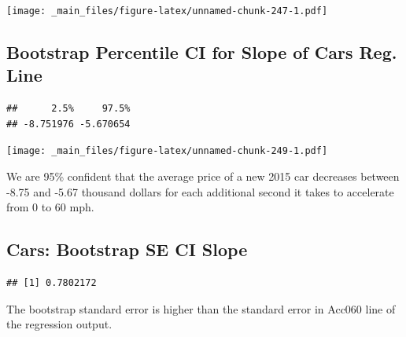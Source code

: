 \documentclass[]{book}
\newenvironment{Shaded}{\begin{snugshade}}{\end{snugshade}}
\newcommand{\KeywordTok}[1]{\textcolor[rgb]{0.13,0.29,0.53}{\textbf{#1}}}
\newcommand{\DecValTok}[1]{\textcolor[rgb]{0.00,0.00,0.81}{#1}}
\newcommand{\FloatTok}[1]{\textcolor[rgb]{0.00,0.00,0.81}{#1}}
\newcommand{\StringTok}[1]{\textcolor[rgb]{0.31,0.60,0.02}{#1}}
\newcommand{\OperatorTok}[1]{\textcolor[rgb]{0.81,0.36,0.00}{\textbf{#1}}}
\newcommand{\NormalTok}[1]{#1}
\begin{document}
\texttt{[image: \_main\_files/figure-latex/unnamed-chunk-247-1.pdf]}

\subsection{Bootstrap Percentile CI for Slope of Cars Reg.
Line}\label{bootstrap-percentile-ci-for-slope-of-cars-reg.-line}

\begin{Shaded}
\end{Shaded}

\begin{verbatim}
##      2.5%     97.5% 
## -8.751976 -5.670654
\end{verbatim}

\texttt{[image: \_main\_files/figure-latex/unnamed-chunk-249-1.pdf]}

We are 95\% confident that the average price of a new 2015 car decreases
between -8.75 and -5.67 thousand dollars for each additional second it
takes to accelerate from 0 to 60 mph.

\subsection{Cars: Bootstrap SE CI
Slope}\label{cars-bootstrap-se-ci-slope}

\begin{Shaded}
\end{Shaded}

\begin{verbatim}
## [1] 0.7802172
\end{verbatim}

The bootstrap standard error is higher than the standard error in Acc060
line of the regression output.
\end{document}
